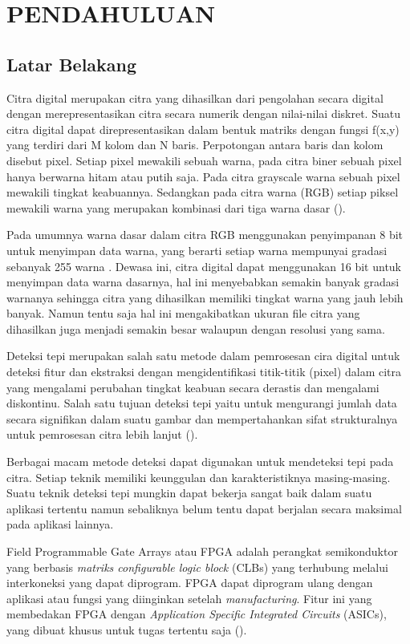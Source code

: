 
\chapter{PENDAHULUAN}

\section{Latar Belakang}
Citra digital merupakan citra yang dihasilkan dari pengolahan secara digital dengan merepresentasikan citra secara numerik dengan nilai-nilai diskret. Suatu citra digital dapat direpresentasikan dalam bentuk matriks dengan fungsi f(x,y) yang terdiri dari M kolom dan N baris. Perpotongan antara baris dan kolom disebut pixel. Setiap pixel mewakili sebuah warna, pada citra biner sebuah pixel hanya berwarna hitam atau putih saja. Pada citra grayscale warna sebuah pixel mewakili tingkat keabuannya. Sedangkan pada citra warna (RGB) setiap piksel mewakili warna yang merupakan kombinasi dari tiga warna dasar (\cite{book:darma}).


Pada umumnya warna dasar dalam citra RGB menggunakan penyimpanan 8 bit untuk menyimpan data warna, yang berarti setiap warna mempunyai gradasi sebanyak 255 warna . Dewasa ini, citra digital dapat menggunakan 16 bit untuk menyimpan data warna dasarnya, hal ini menyebabkan semakin banyak gradasi warnanya sehingga citra yang dihasilkan memiliki tingkat warna yang jauh lebih banyak. Namun tentu saja hal ini mengakibatkan ukuran file citra yang dihasilkan juga menjadi semakin besar walaupun dengan resolusi yang sama.

Deteksi tepi merupakan salah satu metode dalam pemrosesan cira digital untuk deteksi fitur dan ekstraksi dengan mengidentifikasi titik-titik (pixel) dalam citra yang mengalami perubahan tingkat keabuan secara derastis dan mengalami diskontinu. Salah satu tujuan deteksi tepi yaitu untuk mengurangi jumlah data secara signifikan dalam suatu gambar dan mempertahankan sifat strukturalnya untuk pemrosesan citra lebih lanjut (\cite{rashmi}).

Berbagai macam metode deteksi dapat digunakan untuk mendeteksi tepi pada citra. Setiap teknik memiliki keunggulan dan karakteristiknya masing-masing. Suatu teknik deteksi tepi mungkin dapat bekerja sangat baik dalam suatu aplikasi tertentu namun sebaliknya belum tentu dapat berjalan secara maksimal pada aplikasi lainnya.

Field Programmable Gate Arrays atau FPGA adalah perangkat semikonduktor yang berbasis \textit{matriks configurable logic block} (CLBs) yang terhubung melalui interkoneksi yang dapat diprogram. FPGA dapat diprogram ulang dengan aplikasi atau fungsi yang diinginkan setelah \textit{manufacturing}. Fitur ini yang membedakan FPGA dengan \textit{Application Specific Integrated Circuits} (ASICs), yang dibuat khusus untuk tugas tertentu saja (\cite{XILINX}).

